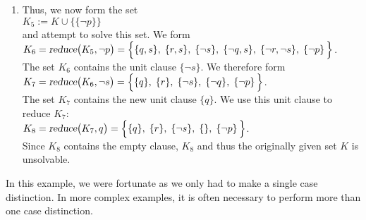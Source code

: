 \begin{enumerate}
\item Thus, we now form the set
      \\[0.2cm]
      \hspace*{1.3cm} $K_5 := K \cup \bigl\{ \{\neg p\} \bigr\}$ \\[0.2cm]
      and attempt to solve this set. We form
      \\[0.2cm]
      \hspace*{1.3cm} 
      $K_6 = \textsl{reduce}\bigl(K_5, \neg p\bigr) =
      \Big\{ \{q, s\},\; \{r, s\},\;\{\neg s\},\; \{\neg q, s\},\; \{\neg r, \neg s\},\;\{\neg p\}\, \Big\}$.
      \\[0.2cm]
      The set $K_6$ contains the unit clause $\{\neg s\}$.
      We therefore form \\[0.2cm]
      \hspace*{1.3cm} 
      $K_7 = \textsl{reduce}\bigl(K_6, \neg s\bigr) =\Big\{ \{q\},\; \{r\},\;\{\neg s\},\; \{\neg q\},\;\{\neg p\}\, \Big\}$.
      \\[0.2cm]
      The set $K_7$ contains the new unit clause $\{q\}$.  We use this unit clause to reduce $K_7$:
      \\[0.2cm]
      \hspace*{1.3cm} 
      $K_8 = \textsl{reduce}\bigl(K_7, q \bigr) =\Big\{ \{q\},\; \{r\},\;\{\neg s\},\; \{\},\;\{\neg p\}\, \Big\}$.
      \\[0.2cm]
      Since $K_8$ contains the empty clause, $K_8$ and thus the originally
      given set $K$ is unsolvable.
\end{enumerate}
In this example, we were fortunate as we only had to make a single case distinction.
In more complex examples, it is often necessary to perform more than one case distinction.

